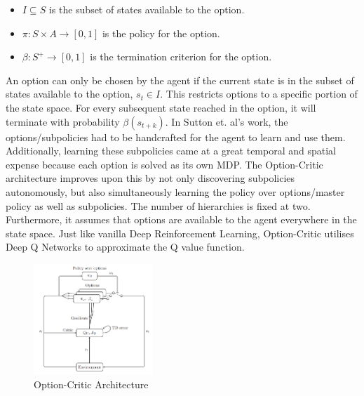 \documentclass[notitlepage,a4paper,11pt]{article}
\begin{document}
\begin{itemize}[noitemsep]
	\itemsep0em
	\item $I \subseteq S$ is the subset of states available to the option.
	\item $\pi : S \times A \to [0,1]$ is the policy for the option.
	\item $\beta : S^+ \to [0,1]$ is the termination criterion for the option.
\end{itemize}

An option can only be chosen by the agent if the current state is in the subset of states available to the option, $s_t \in I$. This restricts options to a specific portion of the state space. For every subsequent state reached in the option, it will terminate with probability $\beta(s_{t+k})$. In Sutton et. al's work, the options/subpolicies had to be handcrafted for the agent to learn and use them. Additionally, learning these subpolicies came at a great temporal and spatial expense because each option is solved as its own MDP. The Option-Critic architecture \cite{bacon2017option} improves upon this by not only discovering subpolicies autonomously, but also simultaneously learning the policy over options/master policy as well as subpolicies. The number of hierarchies is fixed at two. Furthermore, it assumes that options are available to the agent everywhere in the state space. Just like vanilla Deep Reinforcement Learning, Option-Critic utilises Deep Q Networks to approximate the Q value function.



\begin{figure}
	\vspace{-20pt}
	\begin{center}
		\includegraphics[width=0.4\textwidth]{figs/option_critic_architecture.png}
	\end{center}
	\vspace{-20pt}
\caption{Option-Critic Architecture \protect\cite{ribas2011neural}} \label{fig:4}
\end{figure}
\end{document}
